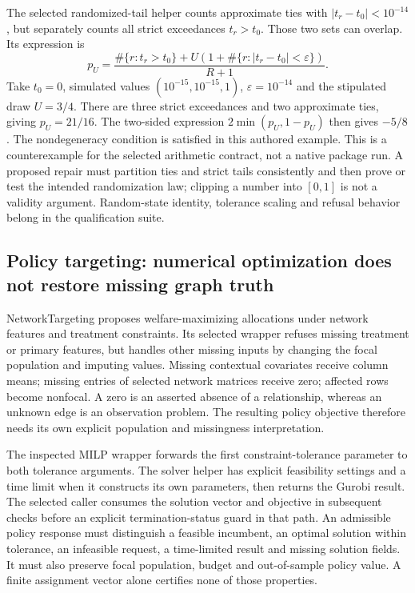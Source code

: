 The selected randomized-tail helper counts approximate ties with $|t_r-t_0|<10^{-14}$, but separately counts all strict exceedances $t_r>t_0$. Those two sets can overlap. Its expression is
\[
 p_U=\frac{\#\{r:t_r>t_0\}+U(1+\#\{r:|t_r-t_0|<\varepsilon\})}{R+1}.
\]
Take $t_0=0$, simulated values $(10^{-15},10^{-15},1)$, $\varepsilon=10^{-14}$ and the stipulated draw $U=3/4$. There are three strict exceedances and two approximate ties, giving $p_U=21/16$. The two-sided expression $2\min(p_U,1-p_U)$ then gives $-5/8$. The nondegeneracy condition is satisfied in this authored example. This is a counterexample for the selected arithmetic contract, not a native package run. A proposed repair must partition ties and strict tails consistently and then prove or test the intended randomization law; clipping a number into $[0,1]$ is not a validity argument. Random-state identity, tolerance scaling and refusal behavior belong in the qualification suite.\citep{exec25_rnet_biclique,exec25_rnet_choice}

\subsection{Policy targeting: numerical optimization does not restore missing graph truth}

NetworkTargeting proposes welfare-maximizing allocations under network features and treatment constraints. Its selected wrapper refuses missing treatment or primary features, but handles other missing inputs by changing the focal population and imputing values. Missing contextual covariates receive column means; missing entries of selected network matrices receive zero; affected rows become nonfocal. A zero is an asserted absence of a relationship, whereas an unknown edge is an observation problem. The resulting policy objective therefore needs its own explicit population and missingness interpretation.\citep{exec25_rnet_target}

The inspected MILP wrapper forwards the first constraint-tolerance parameter to both tolerance arguments. The solver helper has explicit feasibility settings and a time limit when it constructs its own parameters, then returns the Gurobi result. The selected caller consumes the solution vector and objective in subsequent checks before an explicit termination-status guard in that path. An admissible policy response must distinguish a feasible incumbent, an optimal solution within tolerance, an infeasible request, a time-limited result and missing solution fields. It must also preserve focal population, budget and out-of-sample policy value. A finite assignment vector alone certifies none of those properties.\citep{exec25_rnet_target}


